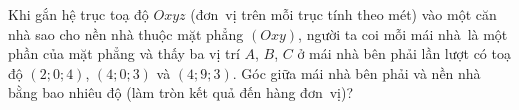 \begin{bt}%
	Khi gắn hệ trục toạ độ $Oxyz$ (đơn~vị trên mỗi trục tính theo mét) vào một căn nhà sao cho nền nhà thuộc mặt phẳng $(Oxy)$, người ta coi mỗi mái nhà~là một phần của mặt phẳng và thấy ba vị trí $A$, $B$, $C$ ở mái nhà bên phải lần lượt có toạ  độ $\left(2;0;4\right)$, $\left(4;0;3\right)$ và $\left(4;9;3\right)$. Góc giữa mái nhà bên phải và nền nhà bằng bao nhiêu độ (làm tròn kết quả đến hàng đơn~vị)?
\end{bt}


